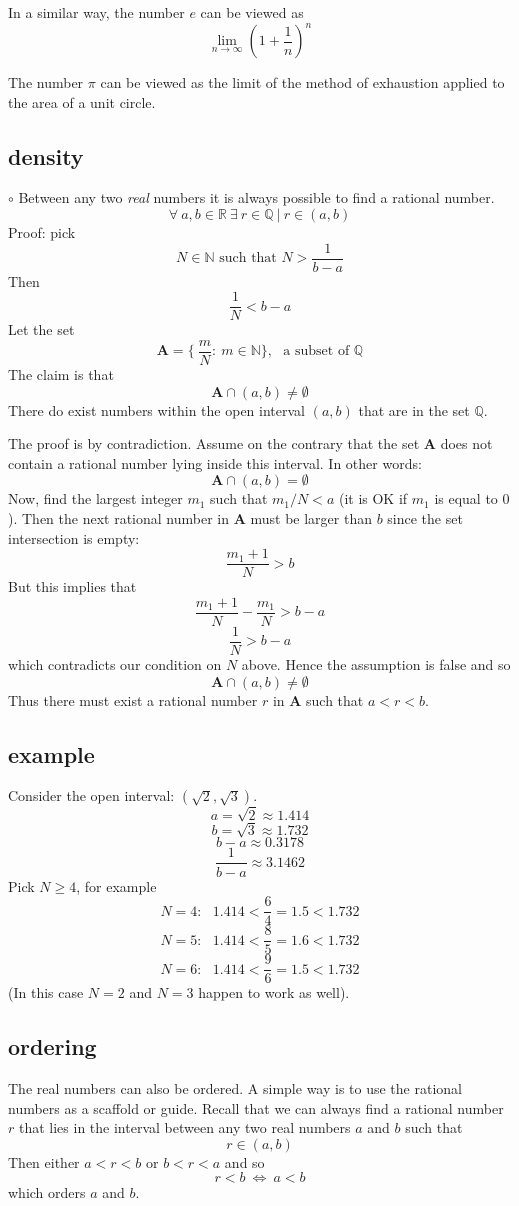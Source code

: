 \documentclass[11pt, oneside]{article}   	%
\begin{document}
In a similar way, the number $e$ can be viewed as
\[ \lim_{n \rightarrow \infty} (1 + \frac{1}{n})^n \]

The number $\pi$ can be viewed as the limit of the method of exhaustion applied to the area of a unit circle.

\subsection*{density}

$\circ$  Between any two \emph{real} numbers it is always possible to find a rational number.  
\[ \forall \ a,b \in \mathbb{R} \ \exists \ r \in \mathbb{Q} \ | \ r \in (a,b) \]
Proof:  pick
\[ N \in \mathbb{N} \text{ such that } N > \frac{1}{b-a} \]
Then 
\[ \frac{1}{N} < b - a \]
Let the set 
\[ \mathbf{A} = \{ \ \frac{m}{N}: \ m \in \mathbb{N} \}, \ \ \ \text{a subset of } \mathbb{Q} \]
The claim is that
\[ \mathbf{A} \cap (a,b) \ne \emptyset \]
There do exist numbers within the open interval $(a,b)$ that are in the set $\mathbb{Q}$.

The proof is by contradiction.  Assume on the contrary that the set $\mathbf{A}$ does not contain a rational number lying inside this interval.  In other words:
\[ \mathbf{A} \cap (a,b) = \emptyset \]
Now, find the largest integer $m_1$ such that $m_1/N < a$ (it is OK if $m_1$ is equal to $0$).  Then the next rational number in $\mathbf{A}$ must be larger than $b$ since the set intersection is empty:
\[ \frac{m_1 + 1}{N} > b \]
But this implies that
\[ \frac{m_1 + 1}{N} - \frac{m_1}{N} > b - a \]
\[ \frac{1}{N} > b - a \]
which contradicts our condition on $N$ above.  Hence the assumption is false and so
\[ \mathbf{A} \cap (a,b) \ne \emptyset \]
Thus there must exist a rational number $r$ in $\mathbf{A}$ such that $a < r < b$.

\subsection*{example}
Consider the open interval:  $(\sqrt{2},\sqrt{3})$.  
\[ a = \sqrt{2} \approx 1.414 \]
\[ b = \sqrt{3} \approx 1.732 \]
\[ b-a \approx 0.3178 \]
\[ \frac{1}{b-a} \approx 3.1462 \]
Pick $N \ge 4$, for example
\[ N = 4: \ \ \  1.414 < \frac{6}{4} = 1.5 < 1.732 \]
\[ N = 5: \ \ \  1.414 < \frac{8}{5} = 1.6 < 1.732 \]
\[ N = 6: \ \ \  1.414 < \frac{9}{6} = 1.5 < 1.732 \]
(In this case $N=2$ and $N=3$ happen to work as well).

\subsection*{ordering}
The real numbers can also be ordered.  A simple way is to use the rational numbers as a scaffold or guide.  Recall that we can always find a rational number $r$ that lies in the interval between any two real numbers $a$ and $b$ such that 
\[ r \in (a,b) \]
Then either $a < r < b$ or $b < r < a$ and so
\[ r < b \ \iff \ a < b \]
which orders $a$ and $b$.
\end{document}
